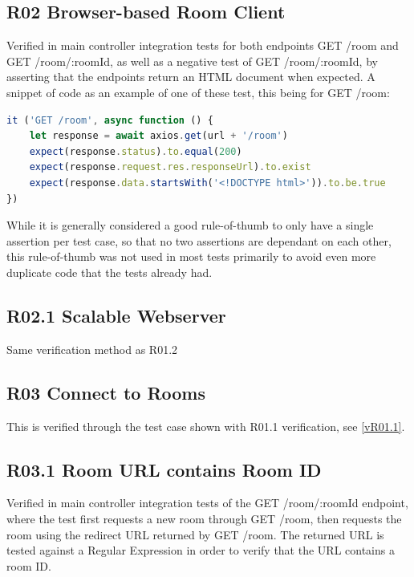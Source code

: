 \subsection{R02 Browser-based Room Client}
\label{vR02}

Verified in main controller integration tests for both endpoints GET /room and GET /room/:roomId, as well as a negative test of GET /room/:roomId, by asserting that the endpoints return an HTML document when expected. A snippet of code as an example of one of these test, this being for GET /room:

\begin{lstlisting}[language=JavaScript]
it ('GET /room', async function () {
    let response = await axios.get(url + '/room')
    expect(response.status).to.equal(200)
    expect(response.request.res.responseUrl).to.exist
    expect(response.data.startsWith('<!DOCTYPE html>')).to.be.true
})
\end{lstlisting}

While it is generally considered a good rule-of-thumb to only have a single assertion per test case, so that no two assertions are dependant on each other, this rule-of-thumb was not used in most tests primarily to avoid even more duplicate code that the tests already had.

\subsection{R02.1 Scalable Webserver}
Same verification method as R01.2
\label{vR02.1}

\subsection{R03 Connect to Rooms}
\label{vR03}

This is verified through the test case shown with R01.1 verification, see \ref{vR01.1}.

\subsection{R03.1 Room URL contains Room ID}
\label{vR03.1}

Verified in main controller integration tests of the GET /room/:roomId endpoint, where the test first requests a new room through GET /room, then requests the room using the redirect URL returned by GET /room. The returned URL is tested against a Regular Expression in order to verify that the URL contains a room ID.

